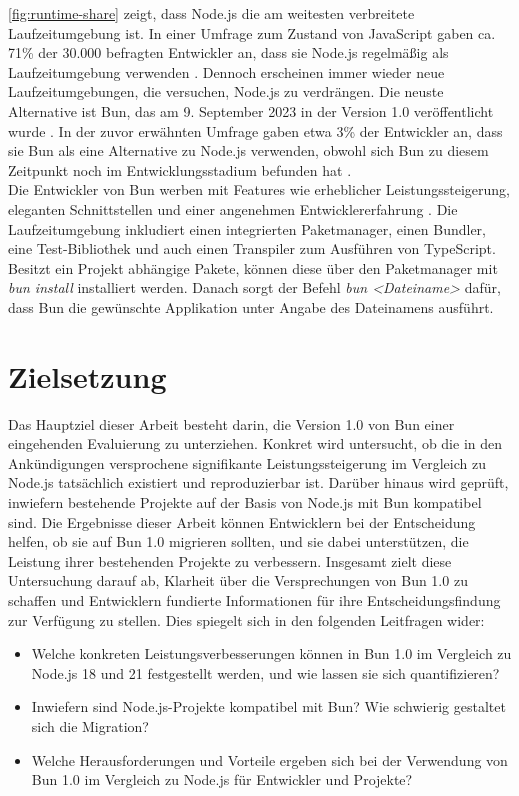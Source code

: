\noindent
\autoref{fig:runtime-share} zeigt, dass Node.js die am weitesten verbreitete Laufzeitumgebung ist. In einer Umfrage zum Zustand von JavaScript gaben ca. 71\% der 30.000 befragten Entwickler an, dass sie Node.js regelmäßig als Laufzeitumgebung verwenden \cite{Greif.2022}. Dennoch erscheinen immer wieder neue Laufzeitumgebungen, die versuchen, Node.js zu verdrängen. Die neuste Alternative ist Bun, das am 9. September 2023 in der Version 1.0 veröffentlicht wurde \cite{Sumner.2023c}. In der zuvor erwähnten Umfrage gaben etwa 3\% der Entwickler an, dass sie Bun als eine Alternative zu Node.js verwenden, obwohl sich Bun zu diesem Zeitpunkt noch im Entwicklungsstadium befunden hat \cite{Greif.2022}.\\

\noindent
Die Entwickler von Bun werben mit Features wie erheblicher Leistungssteigerung, eleganten Schnittstellen und einer angenehmen Entwicklererfahrung \cite{OvenSh.2023b}. Die Laufzeitumgebung inkludiert einen integrierten Paketmanager, einen Bundler, eine Test-Bibliothek und auch einen Transpiler zum Ausführen von TypeScript. Besitzt ein Projekt abhängige Pakete, können diese über den Paketmanager mit \textit{bun install} installiert werden. Danach sorgt der Befehl \textit{bun <Dateiname>} dafür, dass Bun die gewünschte Applikation unter Angabe des Dateinamens ausführt.\cite{Sumner.2023c}

\section{Zielsetzung} \label{sec:introduction-target}
Das Hauptziel dieser Arbeit besteht darin, die Version 1.0 von Bun einer eingehenden Evaluierung zu unterziehen. Konkret wird untersucht, ob die in den Ankündigungen versprochene signifikante Leistungssteigerung im Vergleich zu Node.js tatsächlich existiert und reproduzierbar ist. Darüber hinaus wird geprüft, inwiefern bestehende Projekte auf der Basis von Node.js mit Bun kompatibel sind. Die Ergebnisse dieser Arbeit können Entwicklern bei der Entscheidung helfen, ob sie auf Bun 1.0 migrieren sollten, und sie dabei unterstützen, die Leistung ihrer bestehenden Projekte zu verbessern. Insgesamt zielt diese Untersuchung darauf ab, Klarheit über die Versprechungen von Bun 1.0 zu schaffen und Entwicklern fundierte Informationen für ihre Entscheidungsfindung zur Verfügung zu stellen. Dies spiegelt sich in den folgenden Leitfragen wider:
\begin{itemize}
    \item Welche konkreten Leistungsverbesserungen können in Bun 1.0 im Vergleich zu Node.js 18 und 21 festgestellt werden, und wie lassen sie sich quantifizieren?
    \item Inwiefern sind Node.js-Projekte kompatibel mit Bun? Wie schwierig gestaltet sich die Migration?
    \item Welche Herausforderungen und Vorteile ergeben sich bei der Verwendung von Bun 1.0 im Vergleich zu Node.js für Entwickler und Projekte?
\end{itemize}

